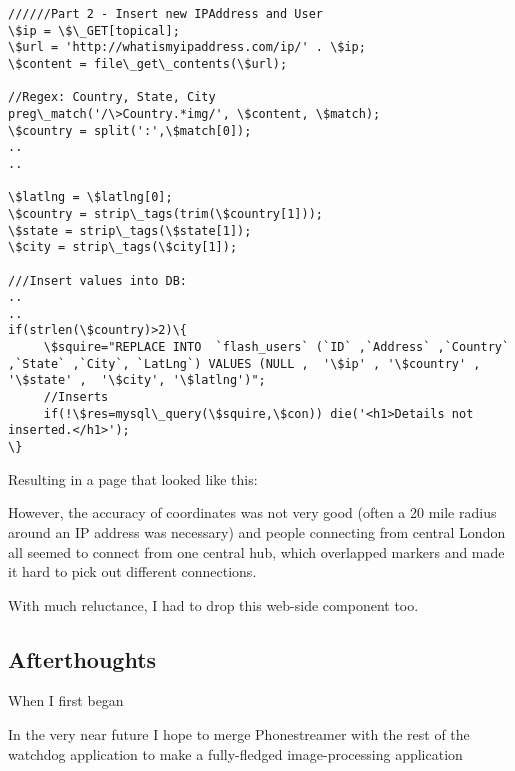 \begin{lstlisting}[title=\bf Snippet from insert.php]
//////Part 2 - Insert new IPAddress and User
\$ip = \$\_GET[topical];
\$url = 'http://whatismyipaddress.com/ip/' . \$ip;
\$content = file\_get\_contents(\$url);

//Regex: Country, State, City
preg\_match('/\>Country.*img/', \$content, \$match); 
\$country = split(':',\$match[0]);
..
..

\$latlng = \$latlng[0];
\$country = strip\_tags(trim(\$country[1]));
\$state = strip\_tags(\$state[1]);
\$city = strip\_tags(\$city[1]);

///Insert values into DB:
..
..
if(strlen(\$country)>2)\{
     \$squire="REPLACE INTO  `flash_users` (`ID` ,`Address` ,`Country` ,`State` ,`City`, `LatLng`) VALUES (NULL ,  '\$ip' , '\$country' , '\$state' ,  '\$city', '\$latlng')";
     //Inserts
     if(!\$res=mysql\_query(\$squire,\$con)) die('<h1>Details not inserted.</h1>');
\}
\end{lstlisting}

Resulting in a page that looked like this:

However, the accuracy of coordinates was not very good (often a 20 mile radius around an IP address was necessary) and people connecting from central London all seemed to connect from one central hub, which overlapped markers and made it hard to pick out different connections.

With much reluctance, I had to drop this web-side component too.

\subsection{Afterthoughts}
When I first began

In the very near future I hope to merge Phonestreamer with the rest of the watchdog application to make a fully-fledged image-processing application
%
%
